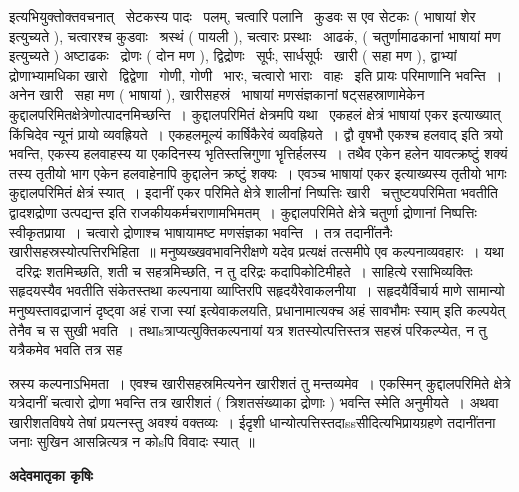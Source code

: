 \documentclass[11pt, openany]{book}
\begin{document}
इत्यभियुक्तोक्तवचनात् \textendash\ सेटकस्य पादः \textendash\ पलम्, चत्वारि पलानि \textendash\ कुडवः स एव सेटकः ( भाषायां शेर इत्युच्यते ), चत्वारश्च कुडवाः \textendash\ श्रस्थं ( पायली ), चत्वारः प्रस्थाः \textendash\ आढकं, ( चतुर्णामाढकानां भाषायां {\qt मण} इत्युच्यते ) अष्टाढकः \textendash\ द्रोणः ( दोन मण ), द्विद्रोणः \textendash\ सूर्पः, सार्धसूर्पः \textendash\ खारी ( सहा मण ), द्वाभ्यां द्रोणाभ्यामधिका खारो \textendash\ द्विद्वेणा \textendash\ गोणी, गोणी \textendash\ भारः, चत्वारो भाराः \textendash\ वाहः \textendash\ इति प्रायः परिमाणानि भवन्ति~। अनेन खारी \textendash\ सहा मण ( भाषायां ), खारीसहस्रं \textendash\ भाषायां मणसंज्ञकानां षट्सहस्राणामेकेन कुद्दालपरिमितक्षेत्रेणोत्पादनमिच्छन्ति~। कुद्दालपरिमितं क्षेत्रमपि यथा \textendash\ एकहलं क्षेत्रं भाषायां {\qt एकर} इत्याख्यात् किंचिदेव न्यूनं प्रायो व्यवह्रियते~। एकहलमूल्यं कार्षिकैरेवं व्यवह्रियते~। द्वौ वृषभौ एकश्च हलवाद् इति त्रयो भवन्ति, एकस्य हलवाहस्य या एकदिनस्य भृतिस्तत्त्रिगुणा भॄत्तिर्हलस्य~। तथैव एकेन हलेन यावत्क्रष्टुं शक्यं तस्य तृतीयो भाग एकेन हलवाहेनापि कुद्दालेन क्रष्टुं शक्यः~। एवञ्च भाषायां {\qt एकर} इत्याख्यस्य तृतीयो भागः कुद्दालपरिमितं क्षेत्रं स्यात्~। इदानीं एकर परिमिते क्षेत्रे शालीनां निष्पत्तिः खारी \textendash\ चत्तुष्टयपरिमिता भवतीति द्वादशद्रोणा उत्पद्यन्त इति राजकीयकर्मचराणामभिमतम्~। कुद्दालपरिमिते क्षेत्रे चतुर्णा द्रोणानां निष्पत्तिः स्वीकृतप्राया~। चत्वारो द्रोणाश्च भाषायामष्ट {\qt मण}संज्ञका भवन्ति~। तत्र तदानींतनैः खारीसहस्रस्योत्पत्तिरभिहिता~॥ मनुष्यख्खवभावनिरीक्षणे यदेव प्रत्यक्षं तत्समीपे एव कल्पनाव्यवहारः~। यथा \textendash\ दरिद्रः शतमिच्छति, शती च सहत्रमिच्छति, न तु दरिद्रः कदापिकोटिमीहते~। साहित्ये रसाभिव्यक्तिः सहृदयस्यैव भवतीति संकेतस्तथा कल्पनाया व्याप्तिरपि सहृदयैरेवाकलनीया~। सहृदयैर्विचार्य माणे सामान्यो मनुष्यस्तावद्राजानं दृष्ट्वा अहं राजा स्यां इत्येवाकलयति, प्रधानामात्यक्च {\qt अहं सावभौमः स्याम्} इति कल्पयेत् तेनैव च स सुखी भवति~। तथाsत्राप्यत्युक्तिकल्पनायां यत्र शतस्योत्पत्तिस्तत्र सहस्रं परिकल्प्येत, न तु यत्रैकमेव भवति तत्र सह

\newpage

\noindent
स्रस्य कल्पनाऽभिमता~। एवश्च खारीसहस्रमित्यनेन खारीशतं तु मन्तव्यमेव~। एकस्मिन् कुद्दालपरिमिते क्षेत्रे यत्रेदानीं चत्वारो द्रोणा भवन्ति तत्र खारीशतं ( त्रिशतसंख्याका द्रोणाः ) भवन्ति स्मेति अनुमीयते~। अथवा खारीशतविषये तेषां प्रयत्नस्तु अवश्यं वक्तव्यः~। ईदृशी धान्योत्पत्तिस्तदाssसीदित्यभिप्रायग्रहणे तदानींतना जनाः सुखिन आसन्नित्यत्र न कोsपि विवादः स्यात्~॥

\begin{center}
\textbf{\Large अदेवमातृका कृषिः \textendash\ }
\end{center}
\end{document}
